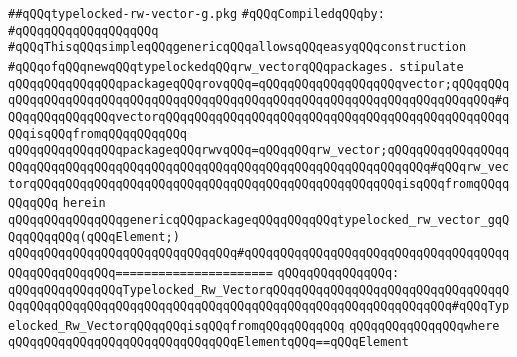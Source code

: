 \label{src/lib/src/typelocked-rw-vector-g.pkg}
\verb|##qQQqtypelocked-rw-vector-g.pkg|\newline
\newline
\verb|#qQQqCompiledqQQqby:|\newline
\verb|#qQQqqQQqqQQqqQQqqQQq|\newline
\newline
\verb|#qQQqThisqQQqsimpleqQQqgenericqQQqallowsqQQqeasyqQQqconstruction|\newline
\verb|#qQQqofqQQqnewqQQqtypelockedqQQqrw_vectorqQQqpackages.|\newline
\newline
\newline
\verb|stipulate|\newline
\verb|qQQqqQQqqQQqqQQqpackageqQQqrovqQQq=qQQqqQQqqQQqqQQqqQQqvector;qQQqqQQqqQQqqQQqqQQqqQQqqQQqqQQqqQQqqQQqqQQqqQQqqQQqqQQqqQQqqQQqqQQqqQQqqQQq#qQQqqQQqqQQqqQQqvectorqQQqqQQqqQQqqQQqqQQqqQQqqQQqqQQqqQQqqQQqqQQqqQQqqQQqisqQQqfromqQQqqQQqqQQq|\newline
\verb|qQQqqQQqqQQqqQQqpackageqQQqrwvqQQq=qQQqqQQqrw_vector;qQQqqQQqqQQqqQQqqQQqqQQqqQQqqQQqqQQqqQQqqQQqqQQqqQQqqQQqqQQqqQQqqQQqqQQqqQQq#qQQqrw_vectorqQQqqQQqqQQqqQQqqQQqqQQqqQQqqQQqqQQqqQQqqQQqqQQqqQQqisqQQqfromqQQqqQQqqQQq|\newline
\newline
\verb|herein|\newline
\newline
\verb|qQQqqQQqqQQqqQQqgenericqQQqpackageqQQqqQQqqQQqtypelocked_rw_vector_gqQQqqQQqqQQq(qQQqElement;)|\newline
\verb|qQQqqQQqqQQqqQQqqQQqqQQqqQQqqQQq#qQQqqQQqqQQqqQQqqQQqqQQqqQQqqQQqqQQqqQQqqQQqqQQqqQQq======================|\newline
\verb|qQQqqQQqqQQqqQQq:|\newline
\verb|qQQqqQQqqQQqqQQqTypelocked_Rw_VectorqQQqqQQqqQQqqQQqqQQqqQQqqQQqqQQqqQQqqQQqqQQqqQQqqQQqqQQqqQQqqQQqqQQqqQQqqQQqqQQqqQQqqQQqqQQqqQQq#qQQqTypelocked_Rw_VectorqQQqqQQqisqQQqfromqQQqqQQqqQQq|\newline
\verb|qQQqqQQqqQQqqQQqwhere|\newline
\verb|qQQqqQQqqQQqqQQqqQQqqQQqqQQqqQQqElementqQQq==qQQqElement|\newline
